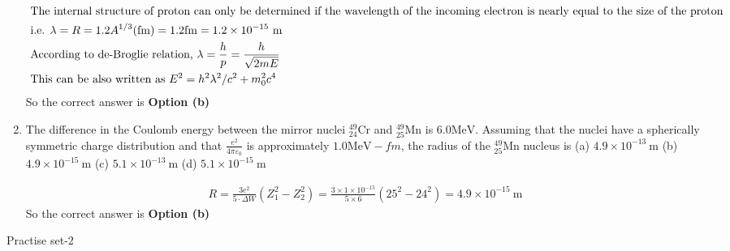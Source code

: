 \begin{enumerate}
\begin{tasks}
	\end{tasks}
\begin{answer}
	\begin{align*}
	\intertext{ The internal structure of proton can only be determined if the wavelength of the incoming electron is nearly equal to the size of the proton}
&\text{	i.e. $\lambda=R=1.2 A^{1 / 3}(\mathrm{fm})=1.2 \mathrm{fm}=1.2 \times 10^{-15} \mathrm{~m}$}\\
	&\text { According to de-Broglie relation, } \lambda=\frac{h}{p}=\frac{h}{\sqrt{2 m E}}\\
&\text { This can be also written as } E^2=h^2 \lambda^2 / c^2+m_0^2 c^4
	\end{align*}
	So the correct answer is \textbf{Option (b)}
\end{answer}
	\item  The difference in the Coulomb energy between the mirror nuclei ${ }_{24}^{49} \mathrm{Cr}$ and ${ }_{25}^{49} \mathrm{Mn}$ is $6.0 \mathrm{MeV}$. Assuming that the nuclei have a spherically symmetric charge distribution and that $\frac{e^2}{4 \pi \varepsilon_0}$ is approximately $1.0 \mathrm{MeV}-f m$, the radius of the ${ }_{25}^{49} \mathrm{Mn}$ nucleus is
	(a) $4.9 \times 10^{-13} \mathrm{~m}$
	(b) $4.9 \times 10^{-15} \mathrm{~m}$
	(c) $5.1 \times 10^{-13} \mathrm{~m}$
	(d) $5.1 \times 10^{-15} \mathrm{~m}$
	\begin{answer}
		\begin{align*}
		R=\frac{3 e^2}{5 \cdot \Delta W}\left(Z_1^2-Z_2^2\right)=\frac{3 \times 1 \times 10^{-15}}{5 \times 6}\left(25^2-24^2\right)=4.9 \times 10^{-15} \mathrm{~m}
		\end{align*}
			So the correct answer is \textbf{Option (b)}
	\end{answer}
\end{enumerate}
\newpage
\begin{abox}
	Practise set-2
\end{abox}
